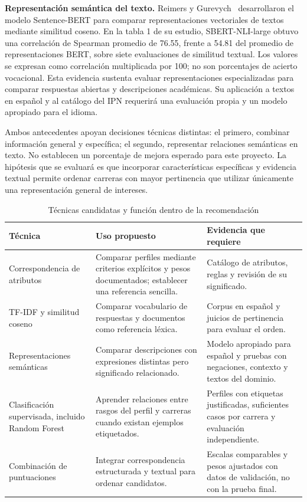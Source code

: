 \textbf{Representación semántica del texto.} Reimers y Gurevych~\cite{Reimers2019SBERT} desarrollaron el modelo Sentence-BERT para comparar representaciones vectoriales de textos mediante similitud coseno. En la tabla 1 de su estudio, SBERT-NLI-large obtuvo una correlación de Spearman promedio de 76.55, frente a 54.81 del promedio de representaciones BERT, sobre siete evaluaciones de similitud textual. Los valores se expresan como correlación multiplicada por 100; no son porcentajes de acierto vocacional. Esta evidencia sustenta evaluar representaciones especializadas para comparar respuestas abiertas y descripciones académicas. Su aplicación a textos en español y al catálogo del IPN requerirá una evaluación propia y un modelo apropiado para el idioma.

Ambos antecedentes apoyan decisiones técnicas distintas: el primero, combinar información general y específica; el segundo, representar relaciones semánticas en texto. No establecen un porcentaje de mejora esperado para este proyecto. La hipótesis que se evaluará es que incorporar características específicas y evidencia textual permite ordenar carreras con mayor pertinencia que utilizar únicamente una representación general de intereses.

\begin{table}[htbp]
\centering
\small
\caption{Técnicas candidatas y función dentro de la recomendación}
\label{tab:tecnicas-recomendacion}
\begin{tabularx}{\textwidth}{L{0.23\textwidth}XX}
\toprule
\textbf{Técnica} & \textbf{Uso propuesto} & \textbf{Evidencia que requiere} \\
\midrule
Correspondencia de atributos & Comparar perfiles mediante criterios explícitos y pesos documentados; establecer una referencia sencilla. & Catálogo de atributos, reglas y revisión de su significado. \\
TF-IDF y similitud coseno & Comparar vocabulario de respuestas y documentos como referencia léxica. & Corpus en español y juicios de pertinencia para evaluar el orden. \\
Representaciones semánticas & Comparar descripciones con expresiones distintas pero significado relacionado. & Modelo apropiado para español y pruebas con negaciones, contexto y textos del dominio. \\
Clasificación supervisada, incluido Random Forest & Aprender relaciones entre rasgos del perfil y carreras cuando existan ejemplos etiquetados. & Perfiles con etiquetas justificadas, suficientes casos por carrera y evaluación independiente. \\
Combinación de puntuaciones & Integrar correspondencia estructurada y textual para ordenar candidatos. & Escalas comparables y pesos ajustados con datos de validación, no con la prueba final. \\
\bottomrule
\end{tabularx}
\end{table}


